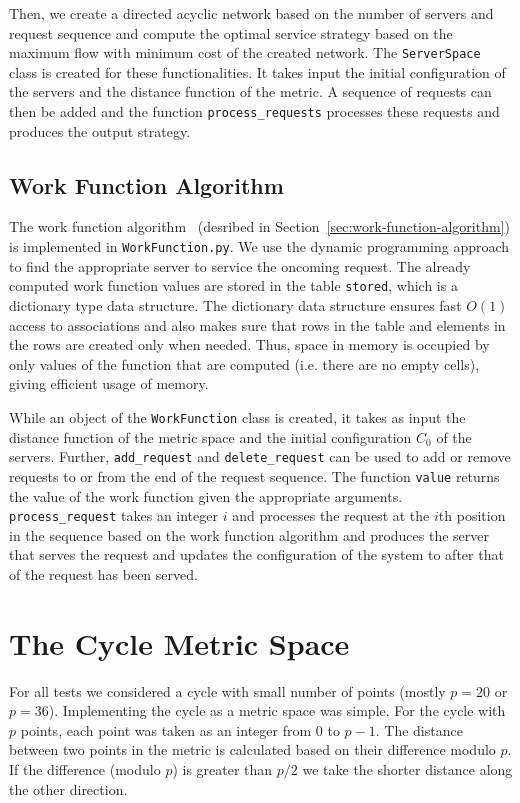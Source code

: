 Then, we create a directed acyclic network based on the number of servers and request sequence and compute the optimal service strategy based on the maximum flow with minimum cost of the created network. The \texttt{ServerSpace} class is created for these functionalities. It takes input the initial configuration of the servers and the distance function of the metric. A sequence of requests can then be added and the function \texttt{process\_requests} processes these requests and produces the output strategy.

\subsection{Work Function Algorithm}

The work function algorithm~\cite{KP94} (desribed in Section~\ref{sec:work-function-algorithm}) is implemented in \texttt{WorkFunction.py}. We use the dynamic programming approach to find the appropriate server to service the oncoming request. The already computed work function values are stored in the table \texttt{stored}, which is a dictionary type data structure. The dictionary data structure ensures fast $O(1)$ access to associations and also makes sure that rows in the table and elements in the rows are created only when needed. Thus, space in memory is occupied by only values of the function that are computed (i.e. there are no empty cells), giving efficient usage of memory.

While an object of the \texttt{WorkFunction} class is created, it takes as input the distance function of the metric space and the initial configuration $C_0$ of the servers. Further, \texttt{add\_request} and \texttt{delete\_request} can be used to add or remove requests to or from the end of the request sequence. The function \texttt{value} returns the value of the work function given the appropriate arguments. \texttt{process\_request} takes an integer $i$ and processes the request at the $i$th position in the sequence based on the work function algorithm and produces the server that serves the request and updates the configuration of the system to after that of the request has been served.

\section{The Cycle Metric Space}\label{sec:cycle-metric-implementation}

For all tests we considered a cycle with small number of points (mostly $p=20$ or $p=36$). Implementing the cycle as a metric space was simple. For the cycle with $p$ points, each point was taken as an integer from $0$ to $p-1$. The distance between two points in the metric is calculated based on their difference modulo $p$. If the difference (modulo $p$) is greater than $p/2$ we take the shorter distance along the other direction.

